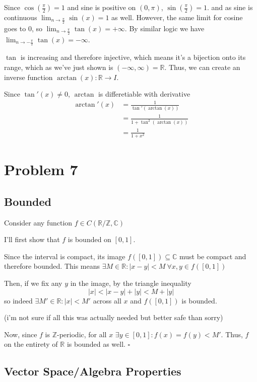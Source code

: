 \documentclass[12pt]{article}
\newcommand{\R}{\mathbb{R}}
\newcommand{\Z}{\mathbb{Z}}
\newcommand{\C}{\mathbb{C}}
\begin{document}
Since $\cos\left(\frac{\pi}{2}\right)=1$
and sine is positive on $(0, \pi)$, $\sin\left(\frac{\pi}{2}\right)=1$.
and as sine is continuous $\lim_{n \to \frac{\pi}{2}} \sin(x) = 1$ as well.
However, the same limit for cosine goes to $0$, so $\lim_{n \to \frac{\pi}{2}} \tan(x)=+\infty$.
By similar logic we have $\lim_{n \to -\frac{\pi}{2}} \tan(x)=-\infty$.

$\tan$ is increasing and therefore injective, which means it's a bijection onto its range,
which as we've just shown is $(-\infty, \infty)=\R$.
Thus, we can create an inverse function $\arctan(x): \R \to I$.

Since $\tan'(x) \ne 0$, $\arctan$ is differetiable with derivative
\begin{align*}
  \arctan'(x)
   & =\frac{1}{\tan'(\arctan(x))}    \\
   & =\frac{1}{1+\tan^2(\arctan(x))} \\
   & =\frac{1}{1+x^2}
\end{align*}

\pagebreak

\section{Problem 7}

\subsection{Bounded}

Consider any function $f \in C(\R/\Z, \C)$

I'll first show that $f$ is bounded on $[0, 1]$.

Since the interval is compact, its image $f([0, 1]) \subseteq \C$ must be compact and therefore bounded.
This means $\exists M \in \R: |x-y| < M\ \forall x, y \in f([0, 1])$

Then, if we fix any $y$ in the image, by the triangle inequality
\[|x| < |x-y| + |y| < M + |y|\]
so indeed $\exists M' \in \R: |x| < M'$ across all $x$ and $f([0, 1])$ is bounded.

(i'm not sure if all this was actually needed but better safe than sorry)

Now, since $f$ is $\Z$-periodic, for all $x$ $\exists y \in [0, 1]: f(x)=f(y) < M'$.
Thus, $f$ on the entirety of $\R$ is bounded as well. $\square$

\subsection{Vector Space/Algebra Properties}
\end{document}
